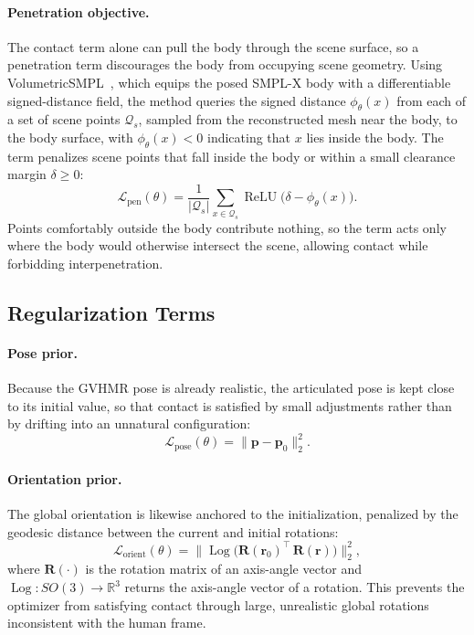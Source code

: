 \paragraph{Penetration objective.} The contact term alone can pull the body through the scene surface, so a penetration term discourages the body from occupying scene geometry. Using VolumetricSMPL~\cite{mihajlovic2025volumetricsmpl}, which equips the posed SMPL-X body with a differentiable signed-distance field, the method queries the signed distance $\phi_\theta(x)$ from each of a set of scene points $\mathcal{Q}_s$, sampled from the reconstructed mesh near the body, to the body surface, with $\phi_\theta(x) < 0$ indicating that $x$ lies inside the body. The term penalizes scene points that fall inside the body or within a small clearance margin $\delta \ge 0$:
\begin{equation}
\label{eq:penetration-loss}
\mathcal{L}_{\mathrm{pen}}(\theta)
=
\frac{1}{|\mathcal{Q}_s|}
\sum_{x \in \mathcal{Q}_s}
\operatorname{ReLU}\!\bigl( \delta - \phi_\theta(x) \bigr).
\end{equation}
Points comfortably outside the body contribute nothing, so the term acts only where the body would otherwise intersect the scene, allowing contact while forbidding interpenetration.

\subsection{Regularization Terms}
\label{sec:method-regularization-terms}

\paragraph{Pose prior.} Because the GVHMR pose is already realistic, the articulated pose is kept close to its initial value, so that contact is satisfied by small adjustments rather than by drifting into an unnatural configuration:
\begin{equation}
\label{eq:pose-prior-loss}
\mathcal{L}_{\mathrm{pose}}(\theta)
=
\lVert \mathbf{p} - \mathbf{p}_0 \rVert_2^2.
\end{equation}

\paragraph{Orientation prior.} The global orientation is likewise anchored to the initialization, penalized by the geodesic distance between the current and initial rotations:
\begin{equation}
\label{eq:orientation-prior-loss}
\mathcal{L}_{\mathrm{orient}}(\theta)
=
\bigl\lVert
\operatorname{Log}\!\bigl( \mathbf{R}(\mathbf{r}_0)^{\top}\, \mathbf{R}(\mathbf{r}) \bigr)
\bigr\rVert_2^2,
\end{equation}
where $\mathbf{R}(\cdot)$ is the rotation matrix of an axis-angle vector and $\operatorname{Log}: SO(3) \to \mathbb{R}^3$ returns the axis-angle vector of a rotation. This prevents the optimizer from satisfying contact through large, unrealistic global rotations inconsistent with the human frame.


